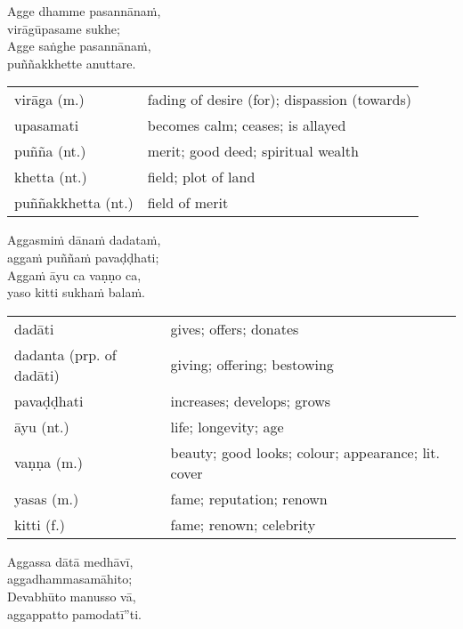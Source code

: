 \documentclass[11pt,oneside]{memoir}
\begin{document}
\clearpage

\begin{spacedquote}
Agge dhamme pasannānaṁ, \\[0pt]
virāgūpasame sukhe; \\[0pt]
Agge saṅghe pasannānaṁ, \\[0pt]
puññakkhette anuttare.
\end{spacedquote}

\begin{longtable}{L{\colOne} L{\colTwo}}
virāga (m.) & fading of desire (for); dispassion (towards)\\[0pt]
upasamati & becomes calm; ceases; is allayed\\[0pt]
puñña (nt.) & merit; good deed; spiritual wealth\\[0pt]
khetta (nt.) & field; plot of land\\[0pt]
puññakkhetta (nt.) & field of merit\\[0pt]
\end{longtable}

\begin{spacedquote}
Aggasmiṁ dānaṁ dadataṁ, \\[0pt]
aggaṁ puññaṁ pavaḍḍhati; \\[0pt]
Aggaṁ āyu ca vaṇṇo ca, \\[0pt]
yaso kitti sukhaṁ balaṁ.
\end{spacedquote}

\begin{longtable}{L{\colOne} L{\colTwo}}
dadāti & gives; offers; donates\\[0pt]
dadanta (prp. of dadāti) & giving; offering; bestowing\\[0pt]
pavaḍḍhati & increases; develops; grows\\[0pt]
āyu (nt.) & life; longevity; age\\[0pt]
vaṇṇa (m.) & beauty; good looks; colour; appearance; lit. cover\\[0pt]
yasas (m.) & fame; reputation; renown\\[0pt]
kitti (f.) & fame; renown; celebrity\\[0pt]
\end{longtable}

\clearpage

\begin{spacedquote}
Aggassa dātā medhāvī, \\[0pt]
aggadhammasamāhito; \\[0pt]
Devabhūto manusso vā, \\[0pt]
aggappatto pamodatī”ti.
\end{spacedquote}
\end{document}
